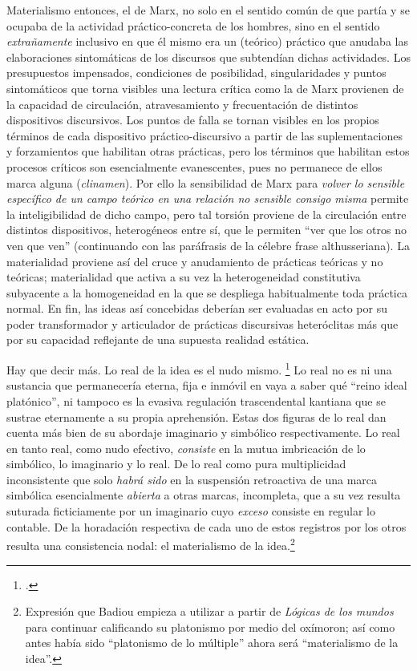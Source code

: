 Materialismo entonces, el de Marx, no solo en el sentido común de que partía y se ocupaba de la actividad práctico-concreta de los hombres, sino en el sentido \emph{extrañamente} inclusivo en que él mismo era un (teórico) práctico que anudaba las elaboraciones sintomáticas de los discursos que subtendían dichas actividades. Los presupuestos impensados, condiciones de posibilidad, singularidades y puntos sintomáticos que torna visibles una lectura crítica como la de Marx provienen de la capacidad de circulación, atravesamiento y frecuentación de distintos dispositivos discursivos. Los puntos de falla se tornan visibles en los propios términos de cada dispositivo práctico-discursivo a partir de las suplementaciones y forzamientos que habilitan otras prácticas, pero los términos que habilitan estos procesos críticos son esencialmente evanescentes, pues no permanece de ellos marca alguna (\emph{clinamen}). Por ello la sensibilidad de Marx para \emph{volver lo sensible específico de un campo teórico  en una relación no sensible consigo misma} permite la inteligibilidad de dicho campo, pero tal torsión proviene de la circulación entre distintos dispositivos, heterogéneos entre sí, que le permiten \enquote{ver que los otros no ven que ven} (continuando con las paráfrasis de la célebre frase althusseriana). La materialidad proviene así del cruce y anudamiento de prácticas teóricas y no teóricas; materialidad que activa a su vez la heterogeneidad constitutiva subyacente a la homogeneidad en la que se despliega habitualmente toda práctica normal. En fin, las ideas así concebidas deberían ser evaluadas en acto por su poder transformador y articulador de prácticas discursivas heteróclitas más que por su capacidad reflejante de una supuesta realidad estática.

Hay que decir más. Lo real de la idea es el nudo mismo. \footcite[Véase en relación con esto:][]{@7149-FARRAN2010} Lo real no es ni una sustancia que permanecería eterna, fija e inmóvil en vaya a saber qué \enquote{reino ideal platónico}, ni tampoco es la evasiva regulación trascendental kantiana que se sustrae eternamente a su propia aprehensión. Estas dos figuras de lo real dan cuenta más bien de su abordaje imaginario y simbólico respectivamente. Lo real en tanto real, como nudo efectivo, \emph{consiste} en la mutua imbricación de lo simbólico, lo imaginario y lo real. De lo real como pura multiplicidad inconsistente que solo \emph{habrá sido} en la suspensión retroactiva de una marca simbólica esencialmente \emph{abierta} a otras marcas, incompleta, que a su vez resulta suturada ficticiamente por un imaginario cuyo \emph{exceso} consiste en regular lo contable. De la horadación respectiva de cada uno de estos registros por los otros resulta una consistencia nodal: el materialismo de la idea.\footnote{Expresión que Badiou empieza a utilizar a partir de \emph{Lógicas de los mundos} para continuar calificando su platonismo por medio del oxímoron; así como antes había sido \enquote{platonismo de lo múltiple} ahora será \enquote{materialismo de la idea}.}

